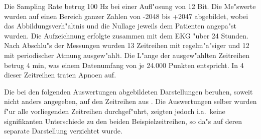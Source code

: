 Die Sampling Rate betrug 100 Hz bei einer Aufl"osung von 12 Bit. Die Me"swerte wurden
auf einen Bereich ganzer Zahlen von -2048 bis +2047 abgebildet, wobei das
Abbildungsverh"altnis und die Nullage jeweils dem Patienten angepa"st wurden. Die
Aufzeichnung erfolgte zusammen mit dem EKG "uber 24 Stunden. Nach Abschlu"s der Messungen
wurden 13 Zeitreihen mit regelm"a"siger und 12 mit periodischer Atmung ausgew"ahlt. Die
L"ange der ausgew"ahlten Zeitreihen betrug 4 min, was einem Datenumfang von je 24.000 Punkten
entspricht.  In 4 dieser Zeitreihen traten Apnoen auf.

Die bei den folgenden Auswertungen abgebildeten Darstellungen beruhen, soweit nicht anders 
angegeben, auf den Zeitreihen aus . Die Auswertungen selber wurden f"ur
alle vorliegenden Zeitreihen durchgef"uhrt, zeigten jedoch i.a.\    keine signifikanten
Unterschiede zu den beiden Beispielzeitreihen, so da"s auf deren separate Darstellung
verzichtet wurde.


